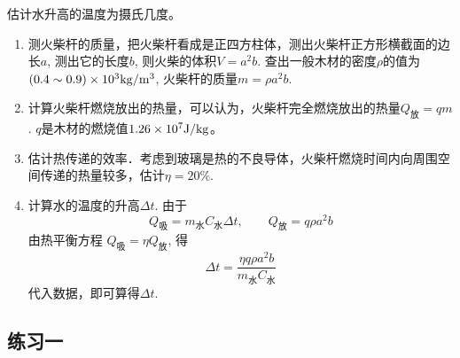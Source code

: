 估计水升高的温度为摄氏几度。

\begin{enumerate}
    \item 测火柴杆的质量，把火柴杆看成是正四方柱体，测出火柴杆正方形横截面的边长$a$, 测出它的长度$b$, 则火柴的体积$V=a^2b$. 查出一般木材的密度$\rho$的值为$(0.4\sim 0.9)\times10^3{\rm kg/m^3}$, 火柴杆的质量$m=\rho a^2b$.
    \item 计算火柴杆燃烧放出的热量，可以认为，火柴杆完全燃烧放出的热量$Q_{\text{放}}=qm$. $q$是木材的燃烧值$1.26\times10^7{\rm J/kg}$。
    \item 估计热传递的效率．考虑到玻璃是热的不良导体，火柴杆燃烧时间内向周围空间传递的热量较多，估计$\eta=20\%$.
    \item 计算水的温度的升高$\Delta t$. 由于
    \[Q_{\text{吸}}=m_{\text{水}}C_{\text{水}}\Delta t,\qquad Q_{\text{放}}=q\rho a^2b\]
    由热平衡方程 $Q_{\text{吸}}=\eta Q_{\text{放}}$, 得
    \[\Delta t=\frac{\eta q\rho a^2b}{m_{\text{水}}C_{\text{水}}}\]
    代入数据，即可算得$\Delta t$.
\end{enumerate}

\subsection{练习一}

